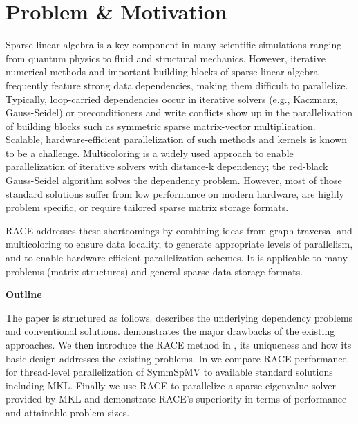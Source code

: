 	
\section{Problem \& Motivation}
	Sparse linear algebra is a key component in many scientific simulations
	ranging from quantum physics to fluid and structural mechanics.
	However, iterative numerical methods  
	and important building blocks of sparse linear algebra frequently feature strong 
	data dependencies, making them difficult to parallelize.
	Typically, loop-carried dependencies occur in
	iterative solvers  (e.g., Kaczmarz, Gauss-Seidel) or preconditioners 
	and write conflicts show up in the parallelization of building blocks such 
	as symmetric sparse matrix-vector multiplication.
	Scalable, hardware-efficient parallelization of such methods and kernels is known to be a 
	challenge. Multicoloring is a widely used approach to enable parallelization
	of iterative solvers with distance-k dependency; \eg the 
	red-black Gauss-Seidel algorithm solves the \DONE dependency problem.
	However, most of those standard solutions suffer from low performance
	on modern hardware, are highly problem specific, or require tailored
        sparse matrix storage formats.

	\Acrshort{RACE} addresses these shortcomings by combining ideas from graph traversal
	and multicoloring to ensure data locality, to generate appropriate levels of parallelism,
	and to enable hardware-efficient parallelization schemes. It is applicable
	to many problems (\ie matrix structures) and general sparse data storage formats.
	

\noindent\textbf{Outline}


\noindent	The paper is structured as follows.  describes
	the underlying dependency problems and conventional
	solutions.  
	demonstrates the major drawbacks of the existing 
	approaches. We then introduce the \acrshort{RACE} method in ,
	its uniqueness and how its basic design addresses the existing problems. 
	In  we compare \acrshort{RACE} performance for thread-level parallelization of \acrfull{SymmSpMV} to
	available standard solutions including \acrshort{MKL}. Finally we use \acrshort{RACE} to parallelize a sparse eigenvalue solver provided by \acrshort{MKL} and demonstrate  \acrshort{RACE}'s superiority in terms of performance and attainable problem sizes. 
		
